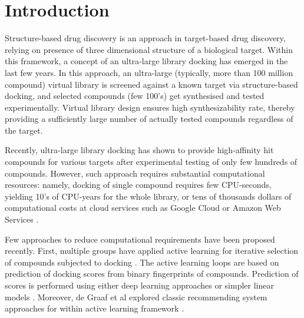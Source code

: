 \section{Introduction}

Structure-based drug discovery is an approach in target-based drug discovery, relying on presence of three dimensional structure of a biological target. Within this framework, a concept of an ultra-large library docking has emerged in the last few years. In this approach, an ultra-large (typically, more than 100 million compound) virtual library is screened against a known target via structure-based docking, and selected compounds (few 100's) get synthesised and tested experimentally. Virtual library design ensures high synthesizability rate, thereby providing a sufficiently large number of actually tested compounds regardless of the target.

Recently, ultra-large library docking has shown to provide high-affinity hit compounds for various targets \cite{sigma2_paper, melatonin_paper, ultralarge_docking_first, gorgulla_open-source_2020, beroza_chemical_2022, noauthor_large_nodate, lu_structure-guided_2021, sadybekov_synthon-based_2022} after experimental testing of only few hundreds of compounds. However, such approach requires substantial computational resources: namely, docking of single compound requires few CPU-seconds, yielding 10's of CPU-years for the whole library, or tens of thousands dollars of computational costs at cloud services such as Google Cloud or Amazon Web Services \cite{irwin_large_2023,grebner_virtual_2020}.

Few approaches to reduce computational requirements have been proposed recently. First, multiple groups have applied active learning for iterative selection of compounds subjected to docking \cite{Graff2021AcceleratingLearning,autoencoders_guided_learning,logistic_regression,deepdocking,leandocking,Yang2021_shoichet_active_learning}. The active learning loops are based on prediction of docking scores from binary fingerprints of compounds. Prediction of scores is performed using either deep learning approaches \cite{deepdocking,Yang2021_shoichet_active_learning,autoencoders_guided_learning, Graff2021AcceleratingLearning} or simpler linear models \cite{leandocking,logistic_regression}. Moreover, de Graaf et al explored classic recommending system approaches for within active learning framework \cite{Graff2021AcceleratingLearning}. 

